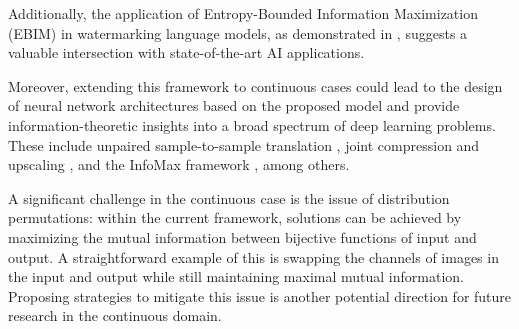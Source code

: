 Additionally, the application of Entropy-Bounded Information Maximization (EBIM) in watermarking language models, as demonstrated in \cite{kirchenbauer2023watermark}, suggests a valuable intersection with state-of-the-art AI applications. 

Moreover, extending this framework to continuous cases could lead to the design of neural network architectures based on the proposed model and provide information-theoretic insights into a broad spectrum of deep learning problems. These include unpaired sample-to-sample translation \cite{isola2016image, zhu2017unpaired, hoffman2018cycada}, joint compression and upscaling \cite{kang2019toward, liu2021lossy}, and the InfoMax framework \cite{tschannen2019mutual, hjelm2018learning}, among others.

A significant challenge in the continuous case is the issue of distribution permutations: within the current framework, solutions can be achieved by maximizing the mutual information between bijective functions of input and output. A straightforward example of this is swapping the channels of images in the input and output while still maintaining maximal mutual information. Proposing strategies to mitigate this issue is another potential direction for future research in the continuous domain.
